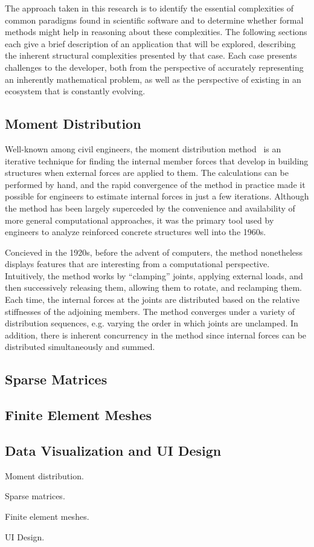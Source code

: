 \documentclass[../../proposal.tex]{subfiles}
\begin{document}
The approach taken in this research is to identify the essential complexities of common paradigms found in scientific software and to determine whether formal methods might help in reasoning about these complexities.  The following sections each give a brief description of an application that will be explored, describing the inherent structural complexities presented by that case.  Each case presents challenges to the developer, both from the perspective of accurately representing an inherently mathematical problem, as well as the perspective of existing in an ecosystem that is constantly evolving.

\subsection{Moment Distribution}

Well-known among civil engineers, the moment distribution method~\cite{} is an iterative technique for finding the internal member forces that develop in building structures when external forces are applied to them.  The calculations can be performed by hand, and the rapid convergence of the method in practice made it possible for engineers to estimate internal forces in just a few iterations.  Although the method has been largely superceded by the convenience and availability of more general computational approaches, it was the primary tool used by engineers to analyze reinforced concrete structures well into the 1960s.

Concieved in the 1920s, before the advent of computers, the method nonetheless displays features that are interesting from a computational perspective.  Intuitively, the method works by ``clamping'' joints, applying external loads, and then successively releasing them, allowing them to rotate, and reclamping them. Each time, the internal forces at the joints are distributed based on the relative stiffnesses of the adjoining members.  The method converges under a variety of distribution sequences, e.g. varying the order in which joints are unclamped.  In addition, there is inherent concurrency in the method since internal forces can be distributed simultaneously and summed.

\subsection{Sparse Matrices}

\subsection{Finite Element Meshes}

\subsection{Data Visualization and UI Design}


Moment distribution.

Sparse matrices.

Finite element meshes.

UI Design.
\end{document}
